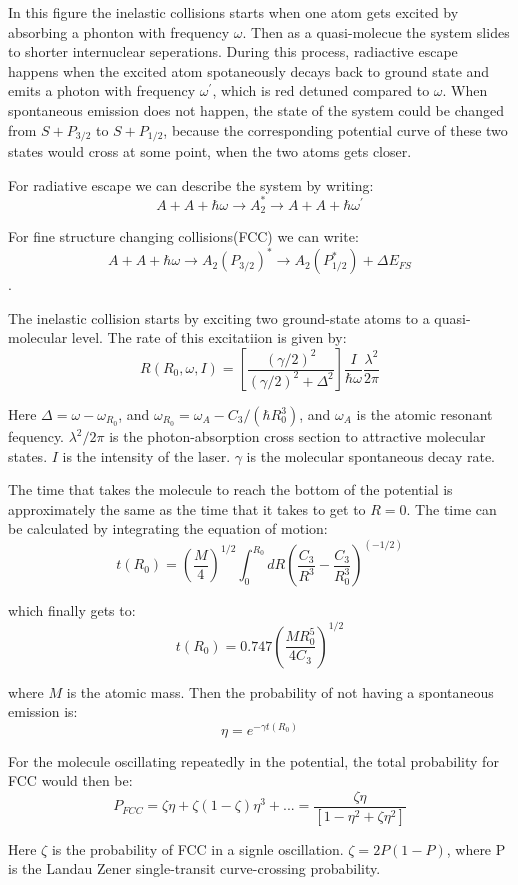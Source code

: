 \documentclass{article}
\begin{document}
In this figure the inelastic collisions starts when one atom gets excited by absorbing a phonton with frequency $\omega$. Then as a quasi-molecue the system slides to shorter internuclear seperations. During this process, radiactive escape happens when the excited atom spotaneously decays back to ground state and emits a photon with frequency $\omega^{'}$, which is red detuned compared to $\omega$. When spontaneous emission does not happen, the state of the system could be changed from $S+P_{3/2}$ to $S+P_{1/2}$, because the corresponding potential curve of these two states would cross at some point, when the two atoms gets closer. 

For radiative escape we can describe the system by writing:
$$A+A+\hbar\omega\rightarrow{A_2^*}\rightarrow{A+A+\hbar\omega^{'}}$$

For fine structure changing collisions(FCC) we can write:
$$A+A+\hbar\omega\rightarrow{A_2(P_{3/2})^*}\rightarrow{A_2(P_{1/2}^*)+\Delta{E_{FS}}}$$.

The inelastic collision starts by exciting two ground-state atoms to a quasi-molecular level. The rate of this excitatiion is given by:
$$R(R_0,\omega,I)=[\frac{(\gamma/2)^2}{(\gamma/2)^2+\Delta^2}]\frac{I}{\hbar\omega}\frac{\lambda^2}{2\pi}$$

Here $\Delta=\omega-\omega_{R_0}$, and $\omega_{R_0}=\omega_A-C_3/(\hbar R_0^3)$, and $\omega_A$ is the atomic resonant fequency. $\lambda^2/2\pi$ is the photon-absorption cross section to attractive molecular states. $I$ is the intensity of the laser. $\gamma$ is the molecular spontaneous decay rate. 

The time that takes the molecule to reach the bottom of the potential is approximately the same as the time that it takes to get to $R=0$. The time can be calculated by integrating the equation of motion:
$$t(R_0)=(\frac{M}{4})^{1/2}\int_0^{R_0}dR(\frac{C_3}{R^3}-\frac{C_3}{R_0^3})^(-1/2)$$

which finally gets to:
$$t(R_0)=0.747(\frac{MR_0^5}{4C_3})^{1/2}$$

where $M$ is the atomic mass. Then the probability of not having a spontaneous emission is:
$$\eta=e^{-\gamma{t(R_0)}}$$

For the molecule oscillating repeatedly in the potential, the total probability for FCC would then be:
$$P_{FCC}=\zeta\eta+\zeta(1-\zeta)\eta^3+...=\frac{\zeta\eta}{[1-\eta^2+\zeta\eta^2]}$$

Here $\zeta$ is the probability of FCC in a signle oscillation. $\zeta=2P(1-P)$, where P is the Landau Zener single-transit curve-crossing probability. 
\end{document}
